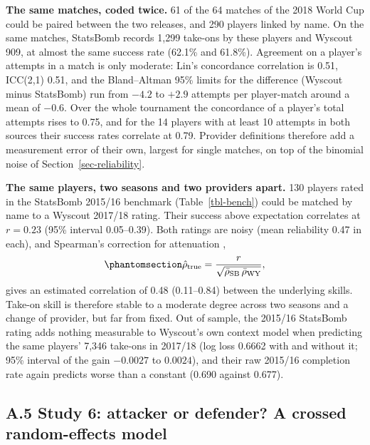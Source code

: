 \documentclass[
  12pt]{article}
\begin{document}
\textbf{The same matches, coded twice.} 61 of the 64 matches of the 2018
World Cup could be paired between the two releases, and 290 players
linked by name. On the same matches, StatsBomb records 1,299 take-ons by
these players and Wyscout 909, at almost the same success rate (62.1\%
and 61.8\%). Agreement on a player's attempts in a match is only
moderate: Lin's concordance correlation \citep{lin1989} is 0.51,
ICC(2,1) \citep{shrout1979} 0.51, and the Bland--Altman 95\% limits
\citep{blandaltman1986} for the difference (Wyscout minus StatsBomb) run
from \(-4.2\) to \(+2.9\) attempts per player-match around a mean of
\(-0.6\). Over the whole tournament the concordance of a player's total
attempts rises to 0.75, and for the 14 players with at least 10 attempts
in both sources their success rates correlate at 0.79. Provider
definitions therefore add a measurement error of their own, largest for
single matches, on top of the binomial noise of
Section~\ref{sec-reliability}.

\textbf{The same players, two seasons and two providers apart.} 130
players rated in the StatsBomb 2015/16 benchmark (Table~\ref{tbl-bench})
could be matched by name to a Wyscout 2017/18 rating. Their success
above expectation correlates at \(r=0.23\) (95\% interval 0.05--0.39).
Both ratings are noisy (mean reliability 0.47 in each), and Spearman's
correction for attenuation \citep{spearman1904},
\begin{equation}\protect\phantomsection\label{eq-disatt}{\hat\rho_{\text{true}} = \frac{r}{\sqrt{\bar\rho_{\text{SB}}\,\bar\rho_{\text{WY}}}},}\end{equation}
gives an estimated correlation of 0.48 (0.11--0.84) between the
underlying skills. Take-on skill is therefore stable to a moderate
degree across two seasons and a change of provider, but far from fixed.
Out of sample, the 2015/16 StatsBomb rating adds nothing measurable to
Wyscout's own context model when predicting the same players' 7,346
take-ons in 2017/18 (log loss 0.6662 with and without it; 95\% interval
of the gain \(-0.0027\) to \(0.0024\)), and their raw 2015/16 completion
rate again predicts worse than a constant (0.690 against 0.677).

\subsection*{A.5 Study 6: attacker or defender? A crossed random-effects
model}\label{sec-glmm}
\end{document}
